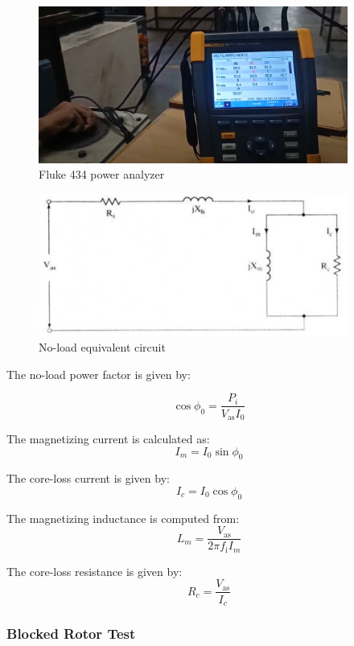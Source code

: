 
\begin{figure}[H]
	\centering
	\includegraphics[width=4in]{sections/section5/images/ParamEstim/FlukeVoltAmpHertz.png}
	\caption{Fluke 434 power analyzer}
	\label{fig:fluke434}
\end{figure}


\begin{figure}[H]
	\centering
	\includegraphics[width=4in]{sections/section5/images/ParamEstim/noloadCircuitKrish.png}
	\caption{No-load equivalent circuit}
	\label{fig:no_load_test}
\end{figure}

The no-load power factor is given by:

$$\cos \phi_0 = \frac{P_i}{V_\text{as}I_0}$$

The magnetizing current is calculated as:
$$I_m = I_0 \sin \phi_0$$

The core-loss current is given by:
$$I_c = I_0 \cos \phi_0$$

The magnetizing inductance is computed from:
$$L_m = \frac{V_\text{as}}{2\pi f_\text{i}I_m}$$

The core-loss resistance is given by:
$$R_c = \frac{V_\text{as}}{I_c}$$


\subsubsection{Blocked Rotor Test}

